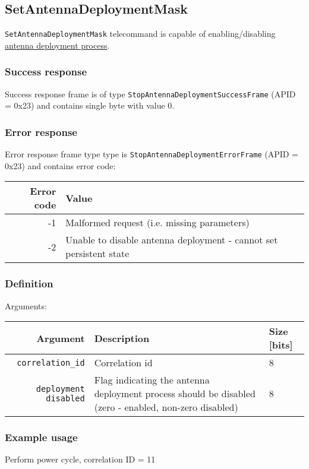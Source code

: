 \subsection{SetAntennaDeploymentMask}
\texttt{SetAntennaDeploymentMask} telecommand is capable of enabling/disabling \hyperref[obcproc:antenna-deployment]{antenna deployment process}.

\subsubsection{Success response}
Success response frame is of type \texttt{StopAntennaDeploymentSuccessFrame} (APID = 0x23) and contains single byte with value 0.

\subsubsection{Error response}

Error response frame type type is \texttt{StopAntennaDeploymentErrorFrame} (APID = 0x23) and contains error code:

\begin{tabular}{r | l}
    Error code & Value \\
    \hline
    -1 & Malformed request (i.e. missing parameters) \\
    -2 & Unable to disable antenna deployment - cannot set persistent state \\
    
\end{tabular}

\subsubsection{Definition}

Arguments: 

\begin{tabular}{r | p{10cm} | l}
    Argument                    & Description               & Size [bits] \\
    \hline
    \texttt{correlation\_id}        & Correlation id            & 8 \\
    \texttt{deployment disabled}    & Flag indicating the antenna deployment process should be disabled (zero - enabled, non-zero disabled) & 8 \\

\end{tabular}

\subsubsection{Example usage}
Perform power cycle, correlation ID = 11

